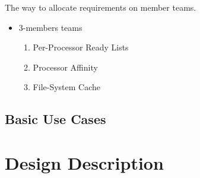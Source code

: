 % 
% 
% 
% 



The way to allocate requirements on member teams. 
\begin{itemize}
    \item 3-members teams
        \begin{enumerate}
            \item Per-Processor Ready Lists
            \item Processor Affinity
            \item File-System Cache
        \end{enumerate}
\end{itemize}



\subsection{Basic Use Cases}


\section{Design Description}

